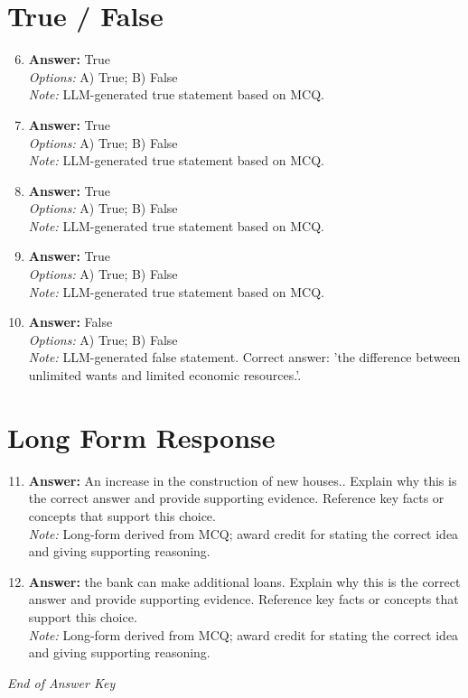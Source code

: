\documentclass[12pt]{article}
\begin{document}
\section*{True / False}
\begin{enumerate}[label=\arabic*.]
\setcounter{enumi}{5}
\item \textbf{Answer:} True
\\ \textit{Options:} A) True; B) False
\\ \textit{Note:} LLM-generated true statement based on MCQ.
\item \textbf{Answer:} True
\\ \textit{Options:} A) True; B) False
\\ \textit{Note:} LLM-generated true statement based on MCQ.
\item \textbf{Answer:} True
\\ \textit{Options:} A) True; B) False
\\ \textit{Note:} LLM-generated true statement based on MCQ.
\item \textbf{Answer:} True
\\ \textit{Options:} A) True; B) False
\\ \textit{Note:} LLM-generated true statement based on MCQ.
\item \textbf{Answer:} False
\\ \textit{Options:} A) True; B) False
\\ \textit{Note:} LLM-generated false statement. Correct answer: 'the difference between unlimited wants and limited economic resources.'.
\end{enumerate}

\section*{Long Form Response}
\begin{enumerate}[label=\arabic*.]
\setcounter{enumi}{10}
\item \textbf{Answer:} An increase in the construction of new houses.. Explain why this is the correct answer and provide supporting evidence. Reference key facts or concepts that support this choice.
\\ \textit{Note:} Long-form derived from MCQ; award credit for stating the correct idea and giving supporting reasoning.
\item \textbf{Answer:} the bank can make additional loans. Explain why this is the correct answer and provide supporting evidence. Reference key facts or concepts that support this choice.
\\ \textit{Note:} Long-form derived from MCQ; award credit for stating the correct idea and giving supporting reasoning.
\end{enumerate}

\vfill
\noindent\textit{End of Answer Key}
\end{document}
